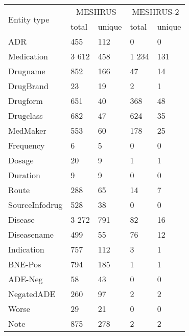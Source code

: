 \begin{tabular}{|l|l|l|l|l|} 
\hline
\multirow{2}{*}{Entity type} &   \multicolumn{2}{c|}{MESHRUS} & \multicolumn{2}{c|}{MESHRUS-2}  \\ 
\cline{2-5}
    &  total & unique  & total & unique    \\ 
\hline
ADR & 455   & 112 & 0 & 0   \\ 
\hline
Medication   &  3 612  & 458  & 1 234  & 131  \\ 
\hline
Drugname & 852   & 166   & 47    & 14 \\ 
\hline
DrugBrand  & 23    & 19 & 2     & 1  \\ 
\hline
Drugform  & 651   & 40   & 368   & 48 \\ 
\hline
Drugclass &  682   & 47  & 624   & 35 \\ 
\hline
MedMaker & 553   & 60  & 178   & 25  \\ 
\hline
Frequency  & 6     & 5  & 0     & 0   \\ 
\hline
Dosage  & 20    & 9   & 1     & 1    \\ 
\hline
Duration  & 9     & 9    & 0     & 0     \\ 
\hline
Route  & 288   & 65   & 14    & 7    \\ 
\hline
SourceInfodrug  & 528   & 38    & 0     & 0   \\ 
\hline
Disease  & 3 272  & 791  & 82    & 16   \\ 
\hline
Diseasename  & 499   & 55  & 76    & 12     \\ 
\hline
Indication & 757   & 112   & 3     & 1     \\ 
\hline
BNE-Pos  & 794   & 185  & 1     & 1     \\ 
\hline
ADE-Neg   & 58    & 43       & 0     & 0         \\ 
\hline
NegatedADE  & 260   & 97    & 2     & 2   \\ 
\hline
Worse  & 29    & 21                   & 0     & 0                       \\ 
\hline
Note  & 875   & 278                  & 2     & 2                       \\
\hline
\end{tabular}
